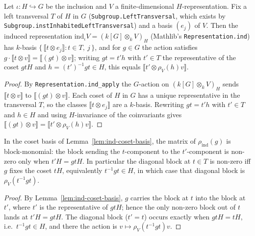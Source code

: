 \begin{lemma}
    \label{lem:ind-coset-basis}
    Let $\iota : H \hookrightarrow G$ be the inclusion and $V$ a
    finite-dimensional $H$-representation. Fix a left transversal $T$ of $H$ in
    $G$ (\texttt{Subgroup.LeftTransversal}, which exists by
    \texttt{Subgroup.instInhabitedLeftTransversal}) and a basis $(e_j)$ of $V$.
    Then the induced representation
    $\mathrm{ind}_\iota V = (k[G] \otimes_k V)_H$ (Mathlib's
    \texttt{Representation.ind}) has $k$-basis $\{\,\llbracket t \otimes e_j
    \rrbracket : t \in T,\ j\,\}$, and for $g \in G$ the action satisfies
    $g \cdot \llbracket t \otimes v \rrbracket = \llbracket (gt) \otimes v
    \rrbracket$; writing $gt = t' h$ with $t' \in T$ the representative of the
    coset $gtH$ and $h = (t')^{-1} g t \in H$, this equals
    $\llbracket t' \otimes \rho_V(h) v \rrbracket$.
\end{lemma}
\begin{proof}
    By \texttt{Representation.ind\_apply} the $G$-action on
    $(k[G] \otimes_k V)_H$ sends $\llbracket t \otimes v \rrbracket$ to
    $\llbracket (gt) \otimes v \rrbracket$. Each coset of $H$ in $G$ has a unique
    representative in the transversal $T$, so the classes $\llbracket t \otimes
    e_j \rrbracket$ are a $k$-basis. Rewriting $gt = t' h$ with $t' \in T$ and
    $h \in H$ and using $H$-invariance of the coinvariants gives
    $\llbracket (gt) \otimes v \rrbracket = \llbracket t' \otimes \rho_V(h) v
    \rrbracket$.
\end{proof}

\begin{lemma}
    \label{lem:ind-block-matrix}
    In the coset basis of Lemma~\ref{lem:ind-coset-basis}, the matrix of
    $\rho_{\mathrm{ind}}(g)$ is block-monomial: the block sending the
    $t$-component to the $t'$-component is non-zero only when $t' H = g t H$. In
    particular the diagonal block at $t \in T$ is non-zero iff $g$ fixes the coset
    $tH$, equivalently $t^{-1} g t \in H$, in which case that diagonal block is
    $\rho_V(t^{-1} g t)$.
\end{lemma}
\begin{proof}
    By Lemma~\ref{lem:ind-coset-basis}, $g$ carries the block at $t$ into the
    block at $t'$, where $t'$ is the representative of $gtH$; hence the only
    non-zero block out of $t$ lands at $t' H = gtH$. The diagonal block ($t' = t$)
    occurs exactly when $gtH = tH$, i.e.\ $t^{-1} g t \in H$, and there the action
    is $v \mapsto \rho_V(t^{-1} g t) v$.
\end{proof}


